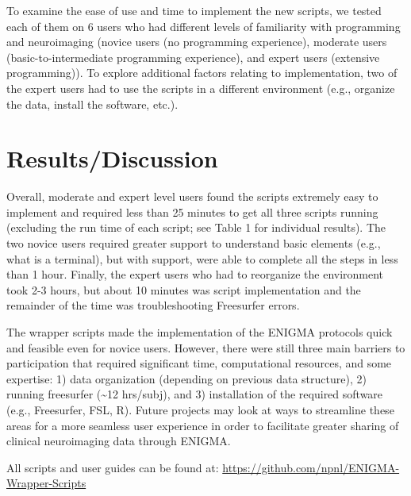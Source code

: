 \documentclass[twocolumn]{bmcart}%
\begin{document}
To examine the ease of use and time to implement the new scripts, we
tested each of them on 6 users who had different levels of familiarity
with programming and neuroimaging (novice users (no programming
experience), moderate users (basic-to-intermediate programming
experience), and expert users (extensive programming)). To explore
additional factors relating to implementation, two of the expert users
had to use the scripts in a different environment (e.g., organize the
data, install the software, etc.).

\section{Results/Discussion}\label{resultsdiscussion}

Overall, moderate and expert level users found the scripts extremely
easy to implement and required less than 25 minutes to get all three
scripts running (excluding the run time of each script; see Table 1 for
individual results). The two novice users required greater support to
understand basic elements (e.g., what is a terminal), but with support,
were able to complete all the steps in less than 1 hour. Finally, the
expert users who had to reorganize the environment took 2-3 hours, but
about 10 minutes was script implementation and the remainder of the time
was troubleshooting Freesurfer errors.

The wrapper scripts made the implementation of the ENIGMA protocols
quick and feasible even for novice users. However, there were still
three main barriers to participation that required significant time,
computational resources, and some expertise: 1) data organization
(depending on previous data structure), 2) running freesurfer
(\textasciitilde{}12 hrs/subj), and 3) installation of the required
software (e.g., Freesurfer, FSL, R). Future projects may look at ways to
streamline these areas for a more seamless user experience in order to
facilitate greater sharing of clinical neuroimaging data through ENIGMA.

All scripts and user guides can be found at:
\url{https://github.com/npnl/ENIGMA-Wrapper-Scripts}

\end{document}

